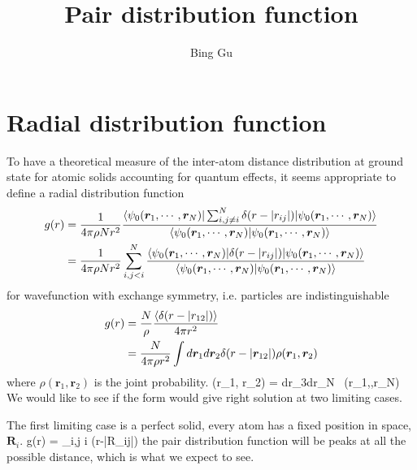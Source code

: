 \documentclass[11pt]{revtex4}
\begin{document}
\title{Pair distribution function}
\author{Bing Gu}

\begin{abstract}

\end{abstract}

\maketitle
\section{Radial distribution function}
To have a theoretical measure of the inter-atom distance distribution at ground state for atomic solids accounting for quantum effects, it seems appropriate to define a radial distribution function 
\begin{align}
 g(r) & = \frac{1}{4\pi \rho N r^2}\frac{\langle \psi_0(\bm r_1, \cdots, \bm r_N)  | \sum_{i,j \neq i}^N \delta(r - |r_{ij}|) | \psi_0(\bm r_1, \cdots, \bm r_N) \rangle}{\langle \psi_0(\bm r_1, \cdots, \bm r_N ) | \psi_0(\bm r_1, \cdots, \bm r_N) \rangle} \\ 
	& =   \frac{1}{4\pi \rho N r^2}\sum_{i,j < i}^N \frac{\langle \psi_0(\bm r_1, \cdots, \bm r_N)  | \delta(r - |r_{ij}|) | \psi_0(\bm r_1, \cdots, \bm r_N) \rangle}{\langle \psi_0(\bm r_1, \cdots, \bm r_N ) | \psi_0(\bm r_1, \cdots, \bm r_N) \rangle}
\end{align}
for wavefunction with exchange symmetry, i.e. particles are indistinguishable 
\begin{align}
 g(r) & = \frac{N}{\rho}\frac{\langle \delta(r - |r_{12}|) \rangle}{4\pi r^2}  \\ 
	&  = \frac{N}{4\pi \rho r^2} \int d\bm r_1 d\bm r_2 \delta(r - |\bm r_{12}|)\rho(\bm r_1,\bm r_2) 
\end{align}
where $\rho(\bm r_1, \bm r_2)$ is the joint probability. 
\be \rho(\bm r_1, \bm r_2) = \int d\bm r_3\cdots d\bm r_N~ \rho(\bm r_1,\cdots,\bm r_N) \ee 
We would like to see if the form would give right solution at two limiting cases. 

The first limiting case is a perfect solid, every atom has a fixed position in space, $\bm R_i$.
\be g(r) = \sum_{i,j \neq i} \delta(r-|\bm R_{ij}|) \ee 
the pair distribution function will be peaks at all the possible distance, which is what we expect to see. 
\end{document}

